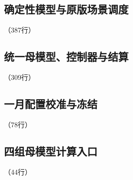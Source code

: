 \label{code:source:03:end}


\subsection{确定性模型与原版场景调度}

\label{code:source:04}

{\small\noindent{}\quad（387行）\par}


\label{code:source:04:end}


\subsection{统一母模型、控制器与结算}

\label{code:source:05}

{\small\noindent{}\quad（309行）\par}


\label{code:source:05:end}


\subsection{一月配置校准与冻结}

\label{code:source:06}

{\small\noindent{}\quad（78行）\par}


\label{code:source:06:end}


\subsection{四组母模型计算入口}

\label{code:source:07}

{\small\noindent{}\quad（44行）\par}


